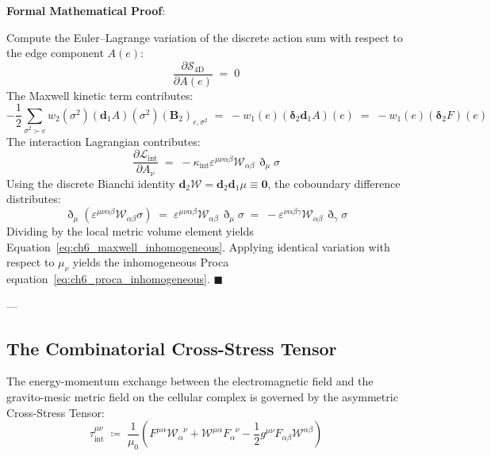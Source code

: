 \documentclass[
    12pt,
    a4paper,
    headings=normal,
    twoside=false,
    open=any,
    parskip=half
]{scrbook}
\newcommand{\ethop}{\eth}
\newenvironment{myproof}[1][]{%
  \par\vspace{6pt}\noindent\textbf{\sffamily\color{maincolor}Formal Mathematical Proof\ifstrempty{#1}{}{ (#1)}}:\par\nopagebreak
}{%
  \penalty50\hfill\ensuremath{\blacksquare}\par\vspace{6pt}
}
\begin{document}
\begin{myproof}
Compute the Euler--Lagrange variation of the discrete action sum with respect to the edge component $A(e)$:
\begin{equation*}
\frac{\partial \mathcal{S}_{4\text{D}}}{\partial A(e)} \;=\; 0
\end{equation*}
The Maxwell kinetic term contributes:
\begin{equation*}
-\frac{1}{2} \sum_{\sigma^2 \succ e} w_2(\sigma^2) (\mathbf{d}_1 A)(\sigma^2) (\mathbf{B}_2)_{e, \sigma^2} \;=\; -w_1(e) \left( \boldsymbol{\delta}_2 \mathbf{d}_1 A \right)(e) \;=\; -w_1(e) (\boldsymbol{\delta}_2 F)(e)
\end{equation*}
The interaction Lagrangian contributes:
\begin{equation*}
\frac{\partial \mathcal{L}_{\text{int}}}{\partial A_\nu} \;=\; -\kappa_{\text{int}} \varepsilon^{\mu\nu\alpha\beta} \mathcal{W}_{\alpha\beta} \, \ethop_\mu \sigma
\end{equation*}
Using the discrete Bianchi identity $\mathbf{d}_2 \mathcal{W} = \mathbf{d}_2 \mathbf{d}_1 \mu \equiv \mathbf{0}$, the coboundary difference distributes:
\begin{equation*}
\ethop_\mu \left( \varepsilon^{\mu\nu\alpha\beta} \mathcal{W}_{\alpha\beta} \sigma \right) \;=\; \varepsilon^{\mu\nu\alpha\beta} \mathcal{W}_{\alpha\beta} \, \ethop_\mu \sigma \;=\; -\varepsilon^{\nu\alpha\beta\gamma} \mathcal{W}_{\alpha\beta} \, \ethop_\gamma \sigma
\end{equation*}
Dividing by the local metric volume element yields Equation~\eqref{eq:ch6_maxwell_inhomogeneous}. Applying identical variation with respect to $\mu_\nu$ yields the inhomogeneous Proca equation~\eqref{eq:ch6_proca_inhomogeneous}.
\end{myproof}

---

\subsection{The Combinatorial Cross-Stress Tensor}

The energy-momentum exchange between the electromagnetic field and the gravito-mesic metric field on the cellular complex is governed by the asymmetric Cross-Stress Tensor:
\begin{equation}
\tau_{\text{int}}^{\mu\nu} \;\coloneqq\; \frac{1}{\mu_0} \left( F^{\mu\alpha} \mathcal{W}_\alpha^{\phantom{\alpha}\nu} + \mathcal{W}^{\mu\alpha} F_\alpha^{\phantom{\alpha}\nu} - \frac{1}{2} g^{\mu\nu} F_{\alpha\beta} \mathcal{W}^{\alpha\beta} \right)
\label{eq:ch6_cross_stress_tensor_master}
\end{equation}
\end{document}
